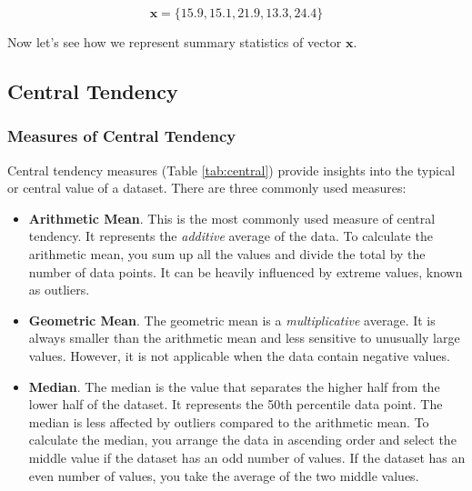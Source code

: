 \documentclass[
]{article}
\begin{document}
\[
\pmb{x} = \{15.9, 15.1, 21.9, 13.3, 24.4\}
\]

Now let's see how we represent summary statistics of vector \(\pmb{x}\).

\hypertarget{central-tendency}{%
\subsection{Central Tendency}\label{central-tendency}}

\hypertarget{measures-of-central-tendency}{%
\subsubsection{Measures of Central Tendency}\label{measures-of-central-tendency}}

Central tendency measures (Table \ref{tab:central}) provide insights into the typical or central value of a dataset. There are three commonly used measures:

\begin{itemize}
\item
  \textbf{Arithmetic Mean}. This is the most commonly used measure of central tendency. It represents the \emph{additive} average of the data. To calculate the arithmetic mean, you sum up all the values and divide the total by the number of data points. It can be heavily influenced by extreme values, known as outliers.
\item
  \textbf{Geometric Mean}. The geometric mean is a \emph{multiplicative} average. It is always smaller than the arithmetic mean and less sensitive to unusually large values. However, it is not applicable when the data contain negative values.
\item
  \textbf{Median}. The median is the value that separates the higher half from the lower half of the dataset. It represents the 50th percentile data point. The median is less affected by outliers compared to the arithmetic mean. To calculate the median, you arrange the data in ascending order and select the middle value if the dataset has an odd number of values. If the dataset has an even number of values, you take the average of the two middle values.
\end{itemize}
\end{document}
